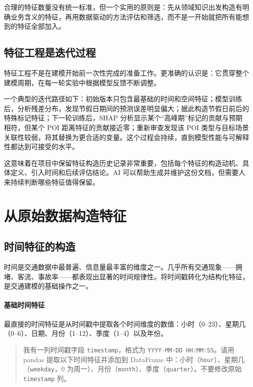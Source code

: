 合理的特征数量没有统一标准，但一个实用的原则是：先从领域知识出发构造有明确业务含义的特征，再用数据驱动的方法评估和筛选，而不是一开始就把所有能想到的特征全部加入。

\subsection{特征工程是迭代过程}

特征工程不是在建模开始前一次性完成的准备工作。更准确的认识是：它贯穿整个建模周期，在每一轮实验中根据模型反馈不断调整。

一个典型的迭代路径如下：初始版本只包含最基础的时间和空间特征；模型训练后，分析残差分布，发现节假日期间的预测误差明显偏大；据此构造节假日前后的特殊标记特征；下一轮训练后，SHAP 分析显示某个“高峰期”标记的贡献与预期相符，但某个 POI 距离特征的贡献接近零；重新审查发现该 POI 类型与目标场景关联性较弱，将其替换为更合适的变量。这个过程会持续，直到模型性能与可解释性都达到可接受的水平。

这意味着在项目中保留特征构造历史记录非常重要，包括每个特征的构造动机、具体定义、引入时间和后续评估结论。AI 可以帮助生成并维护这份文档，但需要人来持续判断哪些特征值得保留。


\section{从原始数据构造特征}

\subsection{时间特征的构造}

时间是交通数据中最普遍、信息量最丰富的维度之一。几乎所有交通现象——拥堵、客流、事故率——都表现出显著的时间规律性。将时间戳转化为结构化特征，是交通建模的基础操作之一。

\paragraph{基础时间特征}

最直接的时间特征是从时间戳中提取各个时间维度的数值：小时（0--23）、星期几（0--6）、日期、月份（1--12）、季度（1--4）以及年份。

\begin{quote}
我有一列时间戳字段 \texttt{timestamp}，格式为 \texttt{YYYY-MM-DD HH:MM:SS}。请用 pandas 提取以下时间特征并添加到 DataFrame 中：小时（\texttt{hour}）、星期几（\texttt{weekday}，0 为周一）、月份（\texttt{month}）、季度（\texttt{quarter}）。不要修改原始 \texttt{timestamp} 列。
\end{quote}

